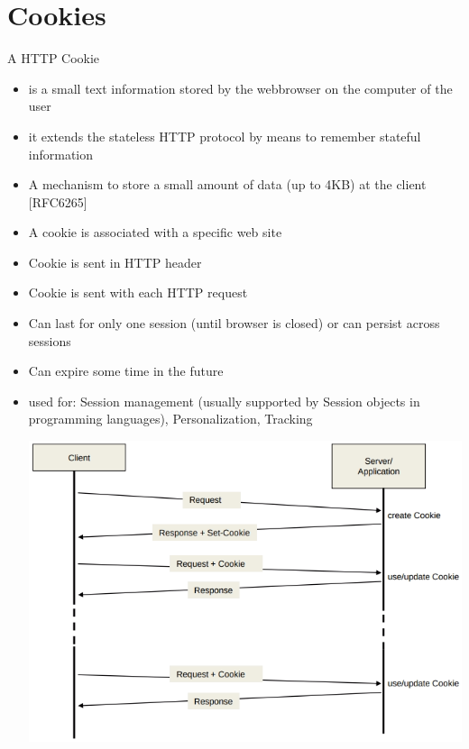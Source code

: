 \documentclass[11pt]{article}
\begin{document}
\section{Cookies}
\label{sec:org2b897bf}
A HTTP Cookie
\begin{itemize}
\item is a small text information stored by the webbrowser on the computer of the user
\item it extends the stateless HTTP protocol by means to remember stateful information
\item A mechanism to store a small amount of data (up to 4KB) at the client [RFC6265]
\item A cookie is associated with a specific web site
\item Cookie is sent in HTTP header
\item Cookie is sent with each HTTP request
\item Can last for only one session (until browser is closed) or can persist across sessions
\item Can expire some time in the future
\item used for: Session management (usually supported by Session objects in programming languages), Personalization, Tracking
\begin{center}
\includegraphics[width=.9\linewidth]{./cookie-diagram.png}
\end{center}
\end{itemize}
\end{document}
